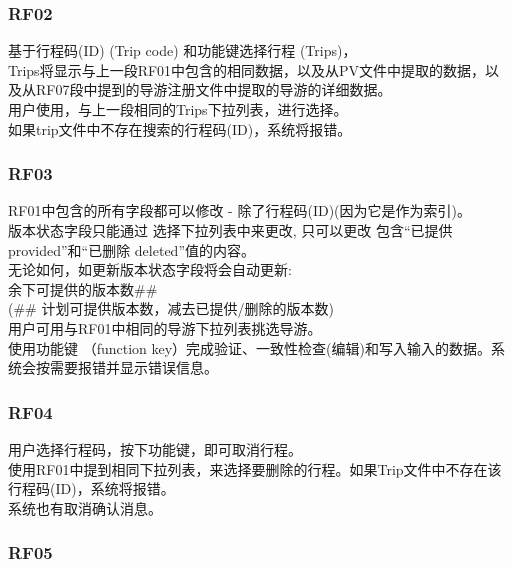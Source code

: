 \hypertarget{ux63a5ux4e58ux5ba2}{%
\subsubsection{RF02}\label{ux63a5ux4e58ux5ba2}}

基于行程码(ID) (Trip code) 和功能键选择行程 (Trips)，\\
Trips将显示与上一段RF01中包含的相同数据，以及从PV文件中提取的数据，以及从RF07段中提到的导游注册文件中提取的导游的详细数据。\\
用户使用，与上一段相同的Trips下拉列表，进行选择。\\
如果trip文件中不存在搜索的行程码(ID)，系统将报错。\\

\hypertarget{ux63a5ux4e58ux5ba2}{%
\subsubsection{RF03}\label{ux63a5ux4e58ux5ba2}}

RF01中包含的所有字段都可以修改 - 除了行程码(ID)(因为它是作为索引)。\\
版本状态字段只能通过 选择下拉列表中来更改, 只可以更改 包含“已提供 provided”和“已删除 deleted”值的内容。\\
无论如何，如更新版本状态字段将会自动更新:\\

余下可提供的版本数##\\

(## 计划可提供版本数，减去已提供/删除的版本数)\\


用户可用与RF01中相同的导游下拉列表挑选导游。\\
使用功能键 （function key）完成验证、一致性检查(编辑)和写入输入的数据。系统会按需要报错并显示错误信息。\\

\hypertarget{ux63a5ux4e58ux5ba2}{%
\subsubsection{RF04}\label{ux63a5ux4e58ux5ba2}}

用户选择行程码，按下功能键，即可取消行程。\\
使用RF01中提到相同下拉列表，来选择要删除的行程。如果Trip文件中不存在该行程码(ID)，系统将报错。\\
系统也有取消确认消息。\\


\hypertarget{ux63a5ux4e58ux5ba2}{%
\subsubsection{RF05}\label{ux63a5ux4e58ux5ba2}}

